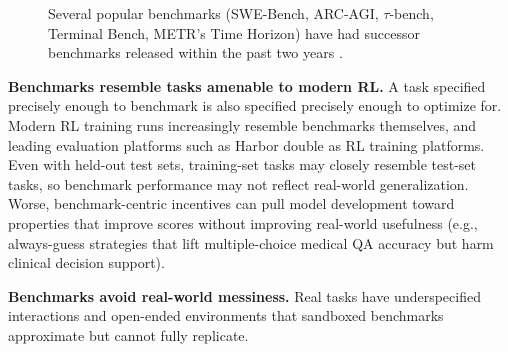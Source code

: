 \documentclass{article}
\begin{document}
\begin{figure}[t]
{%
}
\caption{Several popular benchmarks (SWE-Bench, ARC-AGI, $\tau$-bench, Terminal Bench, METR's Time Horizon) have had successor benchmarks released within the past two years \citep{metrOrgTimeHorizons,arxivabs231006770,arxivabs191101547,arxivabs240612045,tbenchAi,arxivabs250607982,arcprizeOrgBlogArc,arxivabs260111868,openaiComIndexIntroducing,metrOrgBlog2026,swebenchComMultilingualLeaderboard,sierraAiResearchTau,arcprizeOrgArcAgi,arxivabs241003859}.}
\label{fig:successor-benchmarks}
\vspace{-.33cm}
\end{figure}

\begin{overestbox}
\textbf{Benchmarks resemble tasks amenable to modern RL.} A task specified precisely enough to benchmark is also specified precisely enough to optimize for. Modern RL training runs increasingly resemble benchmarks themselves, and leading evaluation platforms such as Harbor \citep{githubComHarborFramework} double as RL training platforms. Even with held-out test sets, training-set tasks may closely resemble test-set tasks, so benchmark performance may not reflect real-world generalization. Worse, benchmark-centric incentives can pull model development toward properties that improve scores without improving real-world usefulness (e.g., always-guess strategies that lift multiple-choice medical QA accuracy but harm clinical decision support).

\smallskip
\textbf{Benchmarks avoid real-world messiness.} Real tasks have underspecified interactions and open-ended environments that sandboxed benchmarks approximate but cannot fully replicate.
\end{overestbox}
\end{document}
